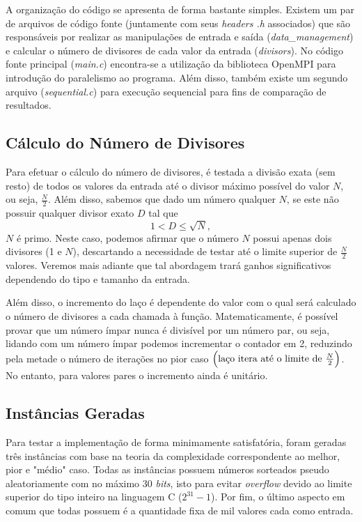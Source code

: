 \documentclass[a4paper, 12pt]{article}
\begin{document}
A organização do código se apresenta de forma bastante simples. Existem um par de arquivos de código fonte (juntamente com seus \emph{headers .h} associados) que são responsáveis por realizar as manipulações de entrada e saída (\emph{data\_management}) e calcular o número de divisores de cada valor da entrada (\emph{divisors}). No código fonte principal (\emph{main.c}) encontra-se a utilização da biblioteca OpenMPI para introdução do paralelismo ao programa. Além disso, também existe um segundo arquivo (\emph{sequential.c}) para execução sequencial para fins de comparação de resultados.

\subsection{Cálculo do Número de Divisores}

Para efetuar o cálculo do número de divisores, é testada a divisão exata (sem resto) de todos os valores da entrada até o divisor máximo possível do valor \(N\), ou seja, \(\frac{N}{2}\). Além disso, sabemos que dado um número qualquer \(N\), se este não possuir qualquer divisor exato \(D\) tal que 
\begin{equation} \label{eq1}
1 < D \leq \sqrt{N},
\end{equation}
\(N\) é primo. Neste caso, podemos afirmar que o número \(N\) possui apenas dois divisores (1 e \(N\)), descartando a necessidade de testar até o limite superior de \(\frac{N}{2}\) valores. Veremos mais adiante que tal abordagem trará ganhos significativos dependendo do tipo e tamanho da entrada.

Além disso, o incremento do laço é dependente do valor com o qual será calculado o número de divisores a cada chamada à função. Matematicamente, é possível provar que um número ímpar nunca é divisível por um número par, ou seja, lidando com um número ímpar podemos incrementar o contador em 2, reduzindo pela metade o número de iterações no pior caso $\Bigl(\text{laço itera até o limite de } \frac{N}{2}\Bigl)$. No entanto, para valores pares o incremento ainda é unitário.

\subsection{Instâncias Geradas} \label{sub2}

Para testar a implementação de forma minimamente satisfatória, foram geradas três instâncias com base na teoria da complexidade correspondente ao melhor, pior e "médio" \hspace{0.1cm}caso. Todas as instâncias possuem números sorteados pseudo aleatoriamente com no máximo 30 \emph{bits}, isto para evitar \emph{overflow} devido ao limite superior do tipo inteiro na linguagem C (\(2^{31} - 1\)). Por fim, o último aspecto em comum que todas possuem é a quantidade fixa de mil valores cada como entrada.
\end{document}
